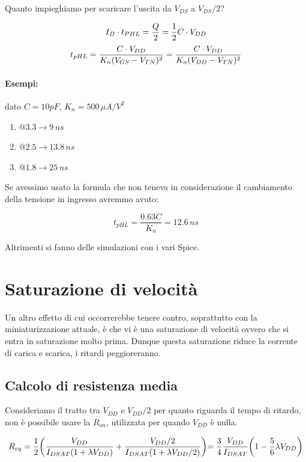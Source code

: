 Quanto impieghiamo per scaricare l'uscita da $V_{DS}$ a $V_{DS}/2$?

\begin{equation*}
    I_D \cdot t_{PHL} = \frac{Q}{2} = \frac{1}{2}C\cdot V_{DD}
\end{equation*}
\begin{equation*}
    t_{pHL} = \frac{C\cdot V_{DD}}{K_n(V_{GS} - V_{TN})^2} = \frac{C\cdot V_{DD}}{K_n(V_{DD} - V_{TN})^2}
\end{equation*}


\paragraph{Esempi:} dato $C=10pF,\,K_n = 500 \,\mu A/V^2$

\begin{enumerate}
    \item $@3.3 \to 9 \,ns$
    \item $@2.5 \to 13.8\, ns$
    \item $@1.8\to 25\, ns$
\end{enumerate}

Se avessimo usato la formula che non teneva in considerazione il cambiamento della tensione in ingresso avremmo avuto:

\begin{equation*}
    t_{pHL} = \frac{0.63C}{K_n} = 12.6 \,ns
\end{equation*}

Altrimenti si fanno delle simulazioni con i vari Spice.

\section{Saturazione di velocità}
Un altro effetto di cui occorrerebbe tenere contro, soprattutto con la miniaturizzazione attuale, è che vi è una saturazione di velocità ovvero che si entra in saturazione molto prima. Dunque questa saturazione riduce la corrente di carica e scarica, i ritardi peggioreranno.

\subsection{Calcolo di resistenza media}
Consideriamo il tratto tra $V_{DD}$ e	$V_{DD}/2$	per	quanto riguarda il tempo	di	ritardo, non è possibile usare la $R_{on}$, utilizzata per quando $V_{DD}$ è nulla.

\begin{equation*}
    R_{eq} = \frac{1}{2}\biggl( \frac{V_{DD}}{I_{DSAT}(1+\lambda V_{DD})} + \frac{V_{DD}/2}{I_{DSAT}(1+\lambda V_{DD} /2)} \biggl) = \frac{3}{4}\frac{V_{DD}}{I_{DSAT}}\biggl(1-\frac{5}{6}\lambda V_{DD} \biggl)
\end{equation*}


